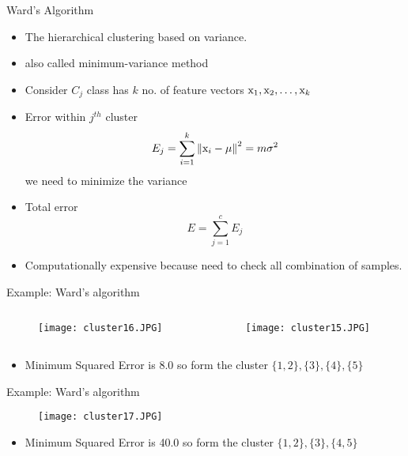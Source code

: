 \begin{frame}{Ward's Algorithm}
\begin{itemize}
\item The hierarchical clustering based on variance.
\item also called minimum-variance method
\item Consider $C_j$ class has $k$ no. of feature vectors ${\rm x}_1,{\rm x}_2,\ldots,{\rm x}_k$
\item Error within $j^{th}$ cluster
\begin{equation}
{E_j} = \sum\limits_{i = 1}^k {{{\left\| {{{\rm x}_i} - \mu } \right\|}^2} = m{\sigma ^2}} \nonumber
\end{equation}
we need to minimize the variance
\item Total error
\begin{equation}
E=\sum\limits_{j = 1}^c E_j \nonumber
\end{equation}
\item Computationally expensive because need to check all combination of samples.
\end{itemize}
\end{frame}

\begin{frame}{Example: Ward's algorithm}
\vspace{-0.5cm}
\begin{columns}
\begin{column}{3cm}
\begin{figure}
\texttt{[image: cluster16.JPG]}
\end{figure}
\end{column}
\begin{column}{6.5cm}
\begin{figure}
\texttt{[image: cluster15.JPG]}
\end{figure}
\end{column}
\end{columns}
\vspace{12pt}
\begin{itemize}
\item Minimum Squared Error is 8.0 so form the cluster $\{1,2\},\{3\},\{4\},\{5\}$
\end{itemize}
\end{frame}

\begin{frame}{Example: Ward's algorithm}
\begin{figure}
\texttt{[image: cluster17.JPG]}
\end{figure}
\begin{itemize}
\item Minimum Squared Error is 40.0 so form the cluster $\{1,2\},\{3\},\{4,5\}$
\end{itemize}
\end{frame}

